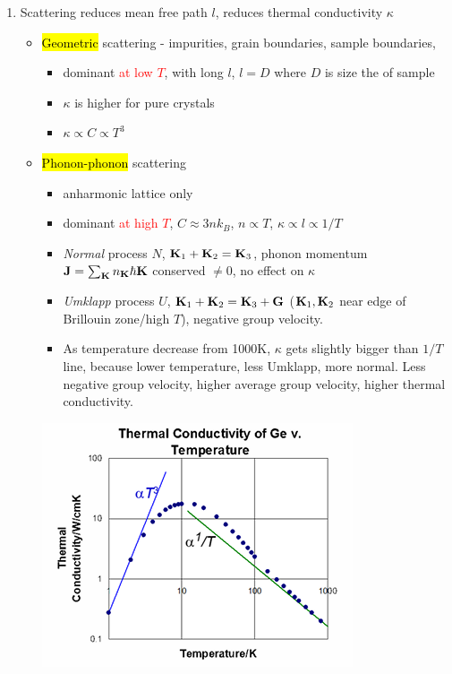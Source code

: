 \documentclass{article}
\theoremstyle{remark}
\theoremstyle{remark}
\begin{document}
\begin{enumerate}
        \item Scattering reduces mean free path $l$, reduces thermal conductivity $\kappa$\begin{itemize}
            \item \hl{Geometric} scattering - impurities, grain boundaries, sample boundaries, \begin{itemize}
                \item dominant \textcolor{red}{at low $T$}, with long $l$, $l=D$ where $D$ is size the of sample
                \item $\kappa$ is higher for pure crystals
                \item $\boxed{\kappa\propto C\propto T^3}$
            \end{itemize}
            \item \hl{Phonon-phonon} scattering\begin{itemize}
                \item anharmonic lattice only
                \item dominant \textcolor{red}{at high $T$}, $C\approx 3nk_B$, $n\propto T$, $\boxed{\kappa\propto l\propto1/T}$
                \item \textit{Normal} process $N$, $\vb{K}_1+\vb{K}_2=\vb{K}_3$, phonon momentum $\vb{J}=\sum_{\vb{K}} n_{\vb{K}}\hbar\vb{K}$ conserved $\neq0$, no effect on $\kappa$
                \item \textit{Umklapp} process $U$, $\vb{K}_1+\vb{K}_2=\vb{K}_3+\vb{G}$ ($\vb{K}_1,\vb{K}_2$ near edge of Brillouin zone/high $T$), negative group velocity.
                \item As temperature decrease from 1000K, $\kappa$ gets slightly bigger than $1/T$ line, because lower temperature, less Umklapp, more normal. 
                    Less negative group velocity, higher average group velocity, higher thermal conductivity.
            \end{itemize}
            \begin{center}
                \includegraphics*[width=0.4\linewidth]{cmp_kappa_vs._T.png}
            \end{center}
    \end{itemize}
\end{enumerate}
\end{document}

